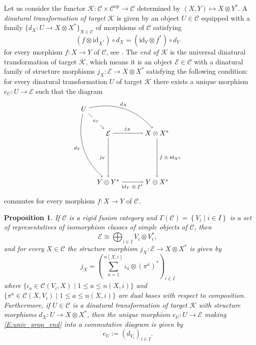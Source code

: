 \documentclass[a4paper,reqno]{amsart}
\newtheorem{proposition}[theorem]{Proposition}
\theoremstyle{definition}
\theoremstyle{remark}
\newcommand{\calC}{\mathcal{C}}
\newcommand{\calE}{\mathcal{E}}
\newcommand{\calK}{\mathcal{K}}
\renewcommand{\Gamma}{\varGamma}
\newcommand{\id}{\mathrm{id}}
\newcommand{\leqs}{\leqslant}
\newcommand{\op}{\mathrm{op}}
\begin{document}
Let us consider the functor $\calK : \calC \times \calC^\op \to \calC$ determined by $(X,Y) \mapsto X \otimes Y^*$. A \textit{dinatural transformation of target $\calK$} is given by an object $U \in \calC$ equipped with a family $\{ d_X : U \to X \otimes X^* \}_{X \in \calC}$ of morphisms of $\calC$ satisfying
\[
 (f \otimes \id_{X^*}) \circ d_X  = (\id_Y \otimes f^*) \circ d_Y
\]
for every morphism $f : X \to Y$ of $\calC$, see \cite[Sec.~IX.4]{M71}. The \textit{end of $\calK$} is the universal dinatural transformation of target $\calK$, which means it is an object $\calE \in \calC$ with a dinatural family of structure morphisms $j_X : \calE \to X \otimes X^*$ satisfying the following condition: for every dinatural transformation $U$ of target $\calK$ there exists a unique morphism $e_U : U \to \calE$ such that the diagram
\begin{equation}\label{E:univ_prop_end}
 \begin{tikzpicture}[descr/.style={fill=white},baseline=(current  bounding  box.center)]
  \node (P0) at (-45:{sqrt(2)*2.5}) {$Y \otimes X^*$};
  \node (P1) at (0:2.5) {$X \otimes X^*$};
  \node (P2) at (-90:2.5) {$Y \otimes Y^*$};
  \node (P3) at (0:0) {$\calE$};
  \node (P4) at (135:{2.5/sqrt(2)}) {$U$};
  \draw
  (P1) edge[->] node[right] {\scriptsize $f \otimes \id_{X^*}$} (P0)
  (P3) edge[->] node[above] {\scriptsize $j_X$} (P1)
  (P2) edge[->] node[below] {\scriptsize $\id_Y \otimes f^*$} (P0)
  (P3) edge[->] node[left] {\scriptsize $j_Y$} (P2)
  (P4) edge[bend left,->] node[above] {\scriptsize $d_X$} (P1)
  (P4) edge[bend right,->] node[left] {\scriptsize $d_Y$} (P2)
  (P4) edge[->] node[descr] {\scriptsize $e_U$} (P3);
 \end{tikzpicture}
\end{equation}
commutes for every morphism $f : X \to Y$ of $\calC$.

\begin{proposition}\label{P:end_fusion}
 If $\calC$ is a rigid fusion category and $\Gamma(\calC) = \left\{ V_i \mid i \in I \right\}$ is a set of representatives of isomorphism classes of simple objects of $\calC$, then
 \[
  \calE \cong \bigoplus_{i \in I} V_i \otimes V_i^*,
 \]
 and for every $X \in \calC$ the structure morphism $j_X : \calE \to X \otimes X^*$ is given by
 \[
  j_X = \left( \sum_{a=1}^{n(X,i)} \iota_a \otimes (\pi^a)^* \right)_{i \in I}
 \]
 where $\{ \iota_a \in \calC(V_i,X) \mid 1 \leqs a \leqs n(X,i) \}$ and $\{ \pi^a \in \calC(X,V_i) \mid 1 \leqs a \leqs n(X,i) \}$ are dual bases with respect to composition. Furthermore, if $U \in \calC$ is a dinatural transformation of target $\calK$ with structure morphisms $d_X : U \to X \otimes X^*$, then the unique morphism $e_U : U \to \calE$ making \eqref{E:univ_prop_end} into a commutative diagram is given by
 \[
  e_U := \left( d_{V_i} \right)_{i \in I}.
 \]
\end{proposition}
\end{document}
